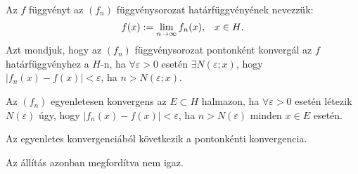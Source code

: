 \begin{definition}
  Az $f$ függvényt az $(f_n)$ függvénysorozat határfüggvényének nevezzük:
  $$
    f(x) := \lim_{n \to \infty} f_n(x)
    \text,\quad
    x \in H
    \text.
  $$
  Azt mondjuk, hogy az $(f_n)$ függvénysorozat pontonként konvergál az $f$
  határfüggvényhez a $H$-n, ha $\forall \varepsilon > 0$ esetén
  $\exists N(\varepsilon; x)$, hogy $|f_n(x) - f(x)| < \varepsilon$, ha
  $n > N(\varepsilon; x)$.
\end{definition}

\begin{definition}
  Az  $(f_n)$ egyenletesen konvergens az $E \subset H$ halmazon, ha
  $\forall\varepsilon > 0$ esetén létezik $N(\varepsilon)$ úgy, hogy
  $|f_n(x) - f(x)| < \varepsilon$, ha $n > N(\varepsilon)$ minden $x \in E$
  esetén.
\end{definition}

\begin{note}
  Az egyenletes konvergenciából következik a pontonkénti konvergencia.

  Az állítás azonban megfordítva nem igaz.
\end{note}

